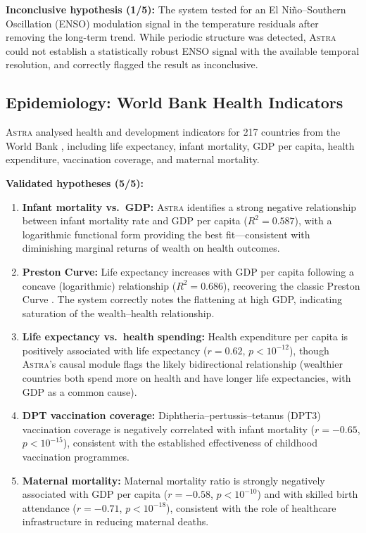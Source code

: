 \documentclass[usenatbib]{rasti}
\newcommand{\astra}{\textsc{Astra}\xspace}
\begin{document}
\textbf{Inconclusive hypothesis (1/5):}
The system tested for an El Ni\~{n}o--Southern Oscillation (ENSO) modulation signal in the temperature residuals after removing the long-term trend. While periodic structure was detected, \astra could not establish a statistically robust ENSO signal with the available temporal resolution, and correctly flagged the result as inconclusive.

\subsection{Epidemiology: World Bank Health Indicators}
\label{sec:crossdomain:epidemiology}

\astra analysed health and development indicators for 217 countries from the World Bank \citep{WorldBank2024}, including life expectancy, infant mortality, GDP per capita, health expenditure, vaccination coverage, and maternal mortality.

\textbf{Validated hypotheses (5/5):}
\begin{enumerate}
  \item[(i)] \textbf{Infant mortality vs.\ GDP:} \astra identifies a strong negative relationship between infant mortality rate and GDP per capita ($R^{2} = 0.587$), with a logarithmic functional form providing the best fit---consistent with diminishing marginal returns of wealth on health outcomes.
  \item[(ii)] \textbf{Preston Curve:} Life expectancy increases with GDP per capita following a concave (logarithmic) relationship ($R^{2} = 0.686$), recovering the classic Preston Curve \citep{Preston1975}. The system correctly notes the flattening at high GDP, indicating saturation of the wealth--health relationship.
  \item[(iii)] \textbf{Life expectancy vs.\ health spending:} Health expenditure per capita is positively associated with life expectancy ($r = 0.62$, $p < 10^{-12}$), though \astra's causal module flags the likely bidirectional relationship (wealthier countries both spend more on health and have longer life expectancies, with GDP as a common cause).
  \item[(iv)] \textbf{DPT vaccination coverage:} Diphtheria--pertussis--tetanus (DPT3) vaccination coverage is negatively correlated with infant mortality ($r = -0.65$, $p < 10^{-15}$), consistent with the established effectiveness of childhood vaccination programmes.
  \item[(v)] \textbf{Maternal mortality:} Maternal mortality ratio is strongly negatively associated with GDP per capita ($r = -0.58$, $p < 10^{-10}$) and with skilled birth attendance ($r = -0.71$, $p < 10^{-18}$), consistent with the role of healthcare infrastructure in reducing maternal deaths.
\end{enumerate}
\end{document}
